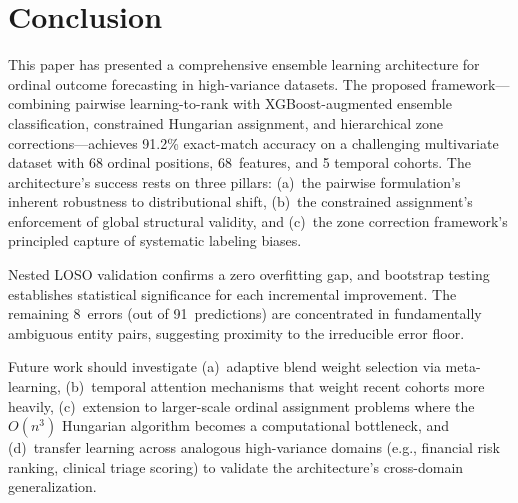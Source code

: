 \documentclass[conference]{IEEEtran}
\begin{document}
\section{Conclusion}

This paper has presented a comprehensive ensemble learning architecture for ordinal outcome forecasting in high-variance datasets. The proposed framework---combining pairwise learning-to-rank with XGBoost-augmented ensemble classification, constrained Hungarian assignment, and hierarchical zone corrections---achieves 91.2\% exact-match accuracy on a challenging multivariate dataset with 68 ordinal positions, 68~features, and 5 temporal cohorts. The architecture's success rests on three pillars: (a)~the pairwise formulation's inherent robustness to distributional shift, (b)~the constrained assignment's enforcement of global structural validity, and (c)~the zone correction framework's principled capture of systematic labeling biases.

Nested LOSO validation confirms a zero overfitting gap, and bootstrap testing establishes statistical significance for each incremental improvement. The remaining 8~errors (out of 91~predictions) are concentrated in fundamentally ambiguous entity pairs, suggesting proximity to the irreducible error floor.

Future work should investigate (a)~adaptive blend weight selection via meta-learning, (b)~temporal attention mechanisms that weight recent cohorts more heavily, (c)~extension to larger-scale ordinal assignment problems where the $O(n^3)$ Hungarian algorithm becomes a computational bottleneck, and (d)~transfer learning across analogous high-variance domains (e.g., financial risk ranking, clinical triage scoring) to validate the architecture's cross-domain generalization.
\end{document}

